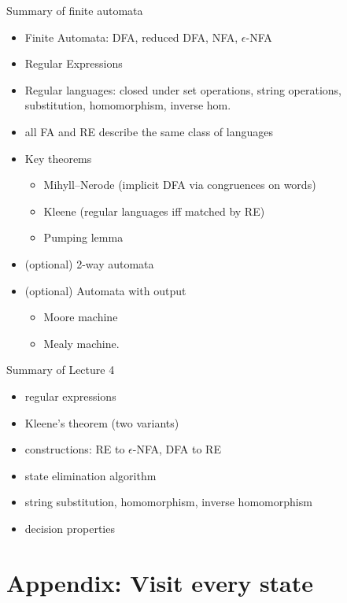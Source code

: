 \documentclass[handout]{beamer}
\begin{document}
\begin{frame}{Summary of finite automata}
\begin{itemize}
	\item Finite Automata: DFA, reduced DFA, NFA, $\epsilon$-NFA
    \item Regular Expressions
	\item Regular languages: closed under set operations, string operations, substitution, homomorphism, inverse hom.
	\item all FA and RE describe the same class of languages
	
	\item Key theorems
	
	\begin{itemize}
		\item Mihyll--Nerode (implicit DFA via congruences on words)
		\item Kleene (regular languages iff matched by RE)
		\item Pumping lemma
	\end{itemize}
\item (optional) 2-way automata
\item (optional) Automata with output
\begin{itemize}
	\item Moore machine
    \item Mealy machine.
\end{itemize}
\end{itemize}

\end{frame}


\begin{frame}{Summary of Lecture 4}

    \begin{itemize}
        \item regular expressions
        \item Kleene's theorem (two variants)
        \item constructions: RE to $\epsilon$-NFA, DFA to RE
        \item state elimination algorithm
        \item string substitution, homomorphism, inverse homomorphism
        \item decision properties
    \end{itemize}    

\end{frame}


\section*{Appendix: Visit every state}
\end{document}
